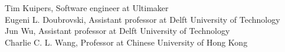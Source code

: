 \documentclass[a4paper,12pt]{letter}
\begin{document}
\begin{letter}{}
\bigskip 
Tim Kuipers, Software engineer at Ultimaker \\
Eugeni L. Doubrovski, Assistant professor at  Delft University of Technology \\
Jun Wu, Assistant professor at Delft University of Technology \\
Charlie C. L. Wang, Professor at Chinese University of Hong Kong



\end{letter}
\end{document}
